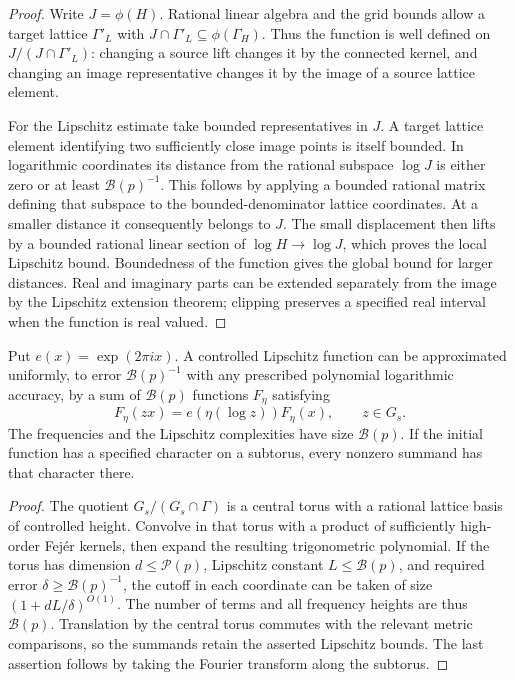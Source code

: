 \begin{proof}
Write $J=\phi(H)$.  Rational linear algebra and the grid bounds allow
a target lattice $\Gamma'_L$ with
$J\cap\Gamma'_L\subseteq\phi(\Gamma_H)$.  Thus the function is
well defined on $J/(J\cap\Gamma'_L)$: changing a source lift changes
it by the connected kernel, and changing an image representative
changes it by the image of a source lattice element.

For the Lipschitz estimate take bounded representatives in $J$.
A target lattice element identifying two sufficiently close image
points is itself bounded.  In logarithmic coordinates its distance
from the rational subspace $\log J$ is either zero or at least
$\mathcal B(p)^{-1}$.  This follows by applying a bounded rational
matrix defining that subspace to the bounded-denominator lattice
coordinates.  At a smaller distance it consequently belongs to $J$.
The small displacement then lifts by a bounded rational linear section
of $\log H\to\log J$, which proves the local Lipschitz bound.
Boundedness of the function gives the global bound for larger
distances.  Real and imaginary parts can be extended separately from
the image by the Lipschitz extension theorem; clipping preserves a
specified real interval when the function is real valued.
\end{proof}

\begin{lemma}\label{prelim:vertical}
Put $e(x)=\exp(2\pi ix)$.  A controlled Lipschitz function can be
approximated uniformly, to error $\mathcal B(p)^{-1}$ with any prescribed
polynomial logarithmic accuracy, by a sum of $\mathcal B(p)$ functions
$F_\eta$ satisfying
\[
 F_\eta(zx)=e(\eta(\log z))F_\eta(x),\qquad z\in G_s.
\]
The frequencies and the Lipschitz complexities have size
$\mathcal B(p)$.  If the initial function has a specified character on
a subtorus, every nonzero summand has that character there.
\end{lemma}

\begin{proof}
The quotient $G_s/(G_s\cap\Gamma)$ is a central torus with a rational
lattice basis of controlled height.  Convolve in that torus with a
product of sufficiently high-order Fej\'er kernels, then expand the
resulting trigonometric polynomial.  If the torus has dimension
$d\leq\mathcal P(p)$, Lipschitz constant $L\leq\mathcal B(p)$,
and required error $\delta\geq\mathcal B(p)^{-1}$, the cutoff in each
coordinate can be taken of size $(1+dL/\delta)^{O(1)}$.  The number of
terms and all frequency heights are thus $\mathcal B(p)$.  Translation
by the central torus commutes with the relevant metric comparisons,
so the summands retain the asserted Lipschitz bounds.  The last
assertion follows by taking the Fourier transform along the subtorus.
\end{proof}

